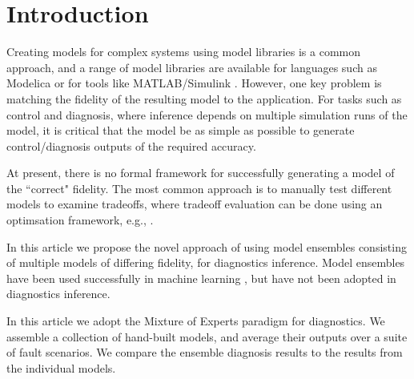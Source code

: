 \section{Introduction}

Creating models for complex systems using model libraries is a common approach, and a range of model libraries are available for languages such as Modelica \citep{??} or for tools like MATLAB/Simulink \citep{?}.
However, one key problem is matching the fidelity of the resulting model to the application. 
For tasks such as control and diagnosis, where inference depends on multiple simulation runs of the model, it is critical that the model be as simple as possible to generate control/diagnosis outputs of the required accuracy.

At present, there is no formal framework for successfully generating a model of the ``correct" fidelity. The most common approach is to manually test different models to examine tradeoffs, where tradeoff evaluation can be done using an optimsation framework, e.g., \citep{wetter2001genopt}.

In this article we propose the novel approach of using model ensembles consisting of multiple models of differing fidelity, for diagnostics inference. Model ensembles have been used successfully in machine learning \citep{brown2010ensemble,dietterich2000ensemble}, but have not been adopted in diagnostics inference.

In this article we adopt the Mixture of Experts paradigm \citep{brown2010ensemble} for diagnostics. We assemble a collection of hand-built models, and average their outputs over a suite of fault scenarios. We compare the ensemble diagnosis results to the results from the individual models.